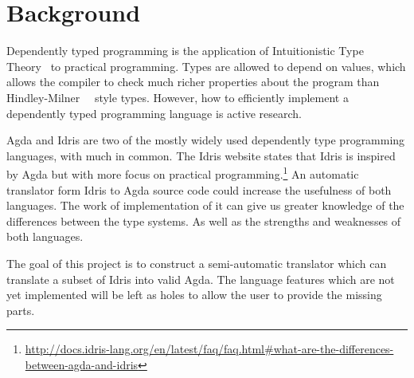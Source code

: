 \documentclass[parskip=half]{scrartcl}
\begin{document}


\section{Background}

Dependently typed programming is the application of
Intuitionistic Type Theory~\cite{martinlof} to practical programming.
Types are allowed to depend on values, which allows the compiler to check much
richer properties about the program than Hindley-Milner~\cite{hindley}~\cite{milner}
style types. However, how to efficiently implement a dependently typed
programming language is active research.

Agda and Idris are two of the mostly widely used dependently type programming
languages, with much in common. The Idris website states that Idris is inspired
by Agda but with more focus on practical
programming.\footnote{\url{http://docs.idris-lang.org/en/latest/faq/faq.html\#what-are-the-differences-between-agda-and-idris}}
An automatic translator form Idris to Agda source code could increase the
usefulness of both languages. The work of implementation of it can give us
greater knowledge of the differences between the type systems. As well as the
strengths and weaknesses of both languages.

The goal of this project is to construct a semi-automatic translator which can
translate a subset of Idris into valid Agda. The language features which are
not yet implemented will be left as holes to allow the user to provide the
missing parts.
\end{document}
